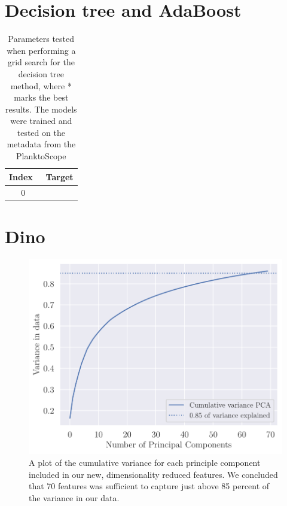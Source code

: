 \section{Decision tree and AdaBoost}\label{ap:decision_adaboost}
\begin{table}[h]
    \centering
    \begin{tabular}{cc}
        \hline
        Index \, & Target \\
        \hline 
        $0$ &  \\
        \hline
    \end{tabular}
    \caption{Parameters tested when performing a grid search for the decision tree method, where * marks the best results. The models were trained and tested on the metadata from the PlanktoScope}
    \label{tab:target_names}
\end{table}

\section{Dino}\label{ap:dino}
\begin{figure}[H]
    \centering
    \includegraphics[width=0.9\linewidth]{examples/tests_eb/figs/cumsum_pca.pdf}
    \caption{A plot of the cumulative variance for each principle component included in our new, dimensionality reduced features. We concluded that 70 features was sufficient to capture just above 85 percent of the variance in our data.}
    \label{fig:cumsumpca}
\end{figure}

